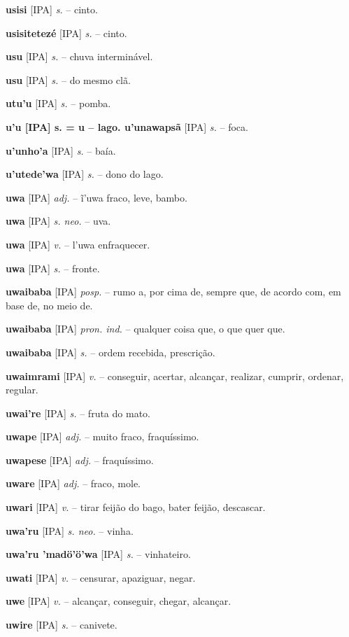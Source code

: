 \textbf{usisi} [IPA] \textit{s.} -- cinto.

\textbf{usisitetezé} [IPA] \textit{s.} -- cinto.

\textbf{usu} [IPA] \textit{s.} -- chuva interminável.

\textbf{usu} [IPA] \textit{s.} -- do mesmo clã.

\textbf{utu'u} [IPA] \textit{s.} -- pomba.

\textbf{u'u [IPA] s. = u -- lago. u'unawapsã} [IPA] \textit{s.} -- foca.

\textbf{u'unho'a} [IPA] \textit{s.} -- baía.

\textbf{u'utede'wa} [IPA] \textit{s.} -- dono do lago.

\textbf{uwa} [IPA] \textit{adj.} -- ĩ'uwa fraco, leve, bambo.

\textbf{uwa} [IPA] \textit{s. neo.} -- uva.

\textbf{uwa} [IPA] \textit{v.} -- l'uwa enfraquecer.

\textbf{uwa} [IPA] \textit{s.} -- fronte.

\textbf{uwaibaba} [IPA] \textit{posp.} -- rumo a, por cima de, sempre que, de acordo com, em base de, no meio de.

\textbf{uwaibaba} [IPA] \textit{pron. ind.} -- qualquer coisa que, o que quer que.

\textbf{uwaibaba} [IPA] \textit{s.} -- ordem recebida, prescrição.

\textbf{uwaimrami} [IPA] \textit{v.} -- conseguir, acertar, alcançar, realizar, cumprir, ordenar, regular.

\textbf{uwai're} [IPA] \textit{s.} -- fruta do mato.

\textbf{uwape} [IPA] \textit{adj.} -- muito fraco, fraquíssimo.

\textbf{uwapese} [IPA] \textit{adj.} -- fraquíssimo.

\textbf{uware} [IPA] \textit{adj.} -- fraco, mole.

\textbf{uwari} [IPA] \textit{v.} -- tirar feijão do bago, bater feijão, descascar.

\textbf{uwa'ru} [IPA] \textit{s. neo.} -- vinha.

\textbf{uwa'ru 'madö'ö'wa} [IPA] \textit{s.} -- vinhateiro.

\textbf{uwati} [IPA] \textit{v.} -- censurar, apaziguar, negar.

\textbf{uwe} [IPA] \textit{v.} -- alcançar, conseguir, chegar, alcançar.

\textbf{uwire} [IPA] \textit{s.} -- canivete.  %

